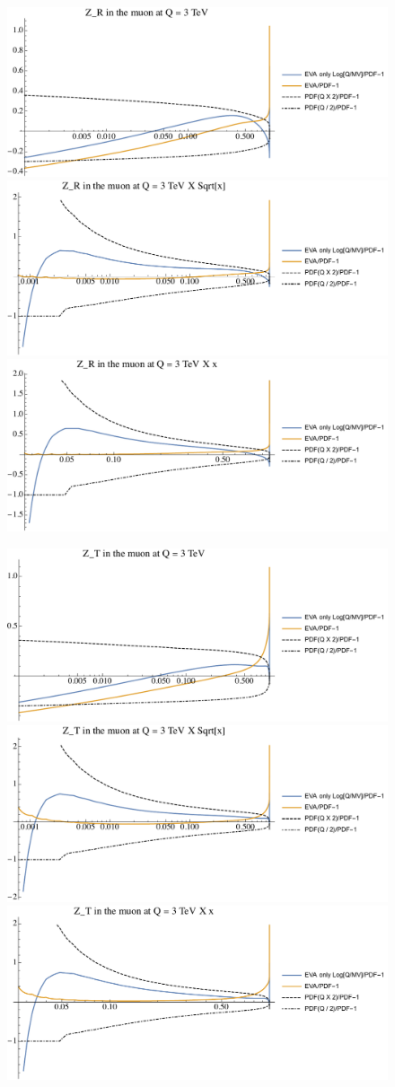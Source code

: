 \documentclass[a4paper,11pt]{article}
\begin{document}
\begin{figure}[ht]
\includegraphics[width=0.46\linewidth]{Notebooks/PlotPDFs/ratios/3TeV/Z_R_Q.pdf}
\includegraphics[width=0.46\linewidth]{Notebooks/PlotPDFs/ratios/3TeV/Z_R_Qsqrtx.pdf}
\includegraphics[width=0.46\linewidth]{Notebooks/PlotPDFs/ratios/3TeV/Z_R_Qx.pdf}
\end{figure}

\begin{figure}[ht]
\includegraphics[width=0.46\linewidth]{Notebooks/PlotPDFs/ratios/3TeV/Z_T_Q.pdf}
\includegraphics[width=0.46\linewidth]{Notebooks/PlotPDFs/ratios/3TeV/Z_T_Qsqrtx.pdf}
\includegraphics[width=0.46\linewidth]{Notebooks/PlotPDFs/ratios/3TeV/Z_T_Qx.pdf}
\end{figure}
\end{document}
